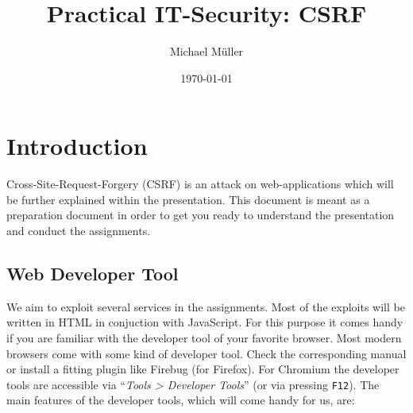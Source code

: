 \documentclass{report}
\title{Practical IT-Security: CSRF}
\author{Michael Müller}
\date{\today}
\begin{document}
\newpage

\maketitle

\newpage


\section{Introduction}

Cross-Site-Request-Forgery (\textsc{CSRF}) is an attack on web-applications
which will be further explained within the presentation.
This document is meant as a preparation document in order to get you ready to
understand the presentation and conduct the assignments.

\subsection{Web Developer Tool}

We aim to exploit several services in the assignments. Most of the exploits
will be written in HTML in conjuction with JavaScript. For this purpose it
comes handy if you are familiar with the developer tool of your favorite 
browser.
Most modern browsers come with some kind of developer tool. Check the
corresponding manual or install a fitting plugin like Firebug (for Firefox). 
For Chromium the developer tools are accessible via ``\emph{Tools > Developer 
Tools}'' (or via pressing \texttt{F12}).
The main features of the developer tools, which will come handy for us, are: 
\end{document}
